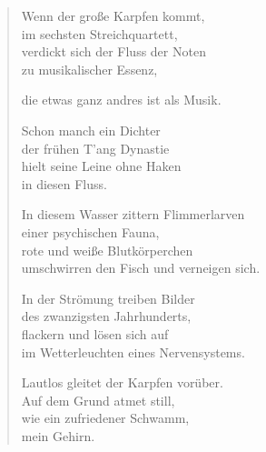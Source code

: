 
\cleartoverso

{\setlength{\stanzaskip}{0.5em}


\vspace*{-\onelineskip}
\begin{verse}

Wenn der große Karpfen kommt,\\
im sechsten Streichquartett,\\
verdickt sich der Fluss der Noten\\
zu musikalischer Essenz,

die etwas ganz andres ist als Musik.

Schon manch ein Dichter\\
der frühen T'ang Dynastie\\
hielt seine Leine ohne Haken\\
in diesen Fluss.

In diesem Wasser zittern Flimmerlarven\\
einer psychischen Fauna,\\
rote und weiße Blutkörperchen\\
umschwirren den Fisch und verneigen sich.

In der Strömung treiben Bilder\\
des zwanzigsten Jahrhunderts,\\
flackern und lösen sich auf\\
im Wetterleuchten eines Nervensystems.

Lautlos gleitet der Karpfen vorüber.\\
Auf dem Grund atmet still,\\
wie ein zufriedener Schwamm,\\
mein Gehirn.

\end{verse}

}

\clearpage

